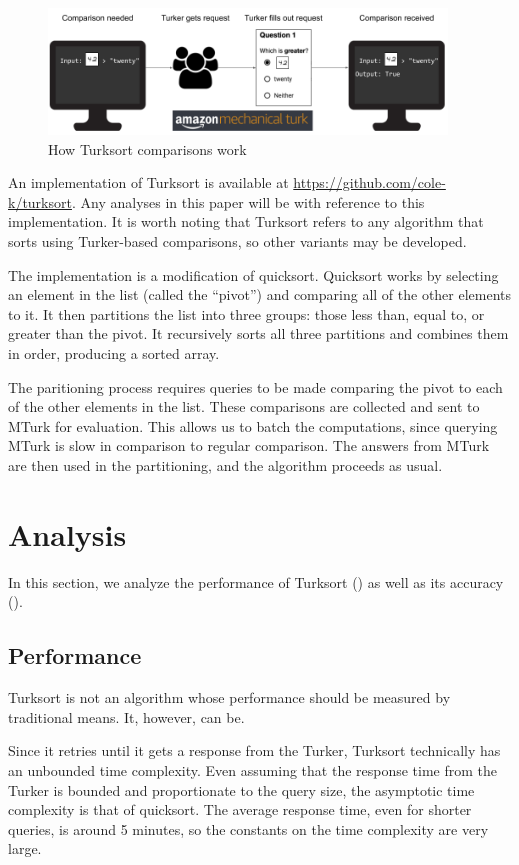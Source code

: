 \documentclass{article}
\begin{document}
\begin{figure}
  \centering
  \includegraphics[width=300pt]{diagram-1.png}
  \caption{How Turksort comparisons work}
  \label{fig:comparison}
\end{figure}

An implementation of Turksort is available at
\url{https://github.com/cole-k/turksort}. Any analyses in this paper will be
with reference to this implementation. It is worth noting that Turksort refers
to any algorithm that sorts using Turker-based comparisons, so other variants
may be developed.

The implementation is a modification of quicksort. Quicksort works by selecting
an element in the list (called the ``pivot'') and comparing all of the other
elements to it. It then partitions the list into three groups: those less than,
equal to, or greater than the pivot. It recursively sorts all three partitions
and combines them in order, producing a sorted array.

The paritioning process requires queries to be made comparing the pivot to each
of the other elements in the list. These comparisons are collected and sent to
MTurk for evaluation. This allows us to batch the computations, since querying
MTurk is slow in comparison to regular comparison. The answers from MTurk are
then used in the partitioning, and the algorithm proceeds as usual.

\section{Analysis}

In this section, we analyze the performance of Turksort ()
as well as its accuracy ().

\subsection{Performance}\label{sec:performance}
Turksort is not an algorithm whose performance should be measured by traditional
means. It, however, can be.

Since it retries until it gets a response from the Turker, Turksort technically
has an unbounded time complexity. Even assuming that the response time from the
Turker is bounded and proportionate to the query size, the asymptotic time
complexity is that of quicksort. The average response time, even for shorter
queries, is around 5 minutes, so the constants on the time complexity are very
large.
\end{document}
